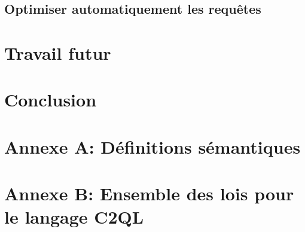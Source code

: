 \documentclass[a4paper,11pt]{article}
\begin{document}
\subsection{Optimiser automatiquement les requêtes}
\label{opti}


\section{Travail futur}
\label{discusion}


\section{Conclusion}


\newpage
\renewcommand{\thepage}{\Roman{page}}
\setcounter{page}{1}
\appendix
\section*{Annexe A: Définitions sémantiques}


\section*{Annexe B: Ensemble des lois pour le langage C2QL}
\newcommand{\args}{Soit $\delta_1$ le schéma relationnel du premier
	argument et $\delta_2$ le schéma relationnel du deuxième
	argument.}


%
\end{document}
